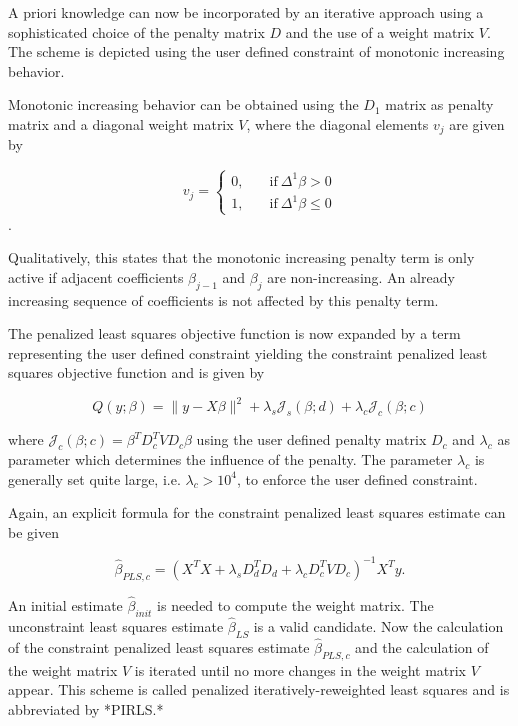\documentclass[10pt,a4paper]{article}
\begin{document}
	A priori knowledge can now be incorporated by an iterative approach using a sophisticated choice of the penalty matrix $D$ and the use of a weight matrix $V$. The scheme is depicted using the user defined constraint of monotonic increasing behavior.  
	
	Monotonic increasing behavior can be obtained using the $D_1$ matrix as penalty matrix and a diagonal weight matrix $V$, where the diagonal elements $v_j$ are given by
	
	$$v_j = \begin{cases} 0, & \quad \text{if} \ \Delta^1 \beta > 0 \\ 
						  1, & \quad \text{if} \ \Delta^1 \beta \le 0 
		 	\end{cases}$$.
	
	Qualitatively, this states that the monotonic increasing penalty term is only active if adjacent coefficients $\beta_{j-1}$ and $\beta_j$ are non-increasing. An already increasing sequence of coefficients is not affected by this penalty term. 
	
	The penalized least squares objective function is now expanded by a term representing the user defined constraint yielding the constraint penalized least squares objective function and is given by
	
	$$Q(y; \beta) = \lVert y - X\beta \rVert^2 + \lambda_s \mathcal J_s(\beta; d) + \lambda_c \mathcal J_c(\beta; c) $$
	
	where $\mathcal J_c(\beta; c) = \beta^T D_c^T V D_c \beta$ using the user defined penalty matrix $D_c$ and $\lambda_c$ as parameter which determines the influence of the penalty. The parameter $\lambda_c$ is generally set quite large, i.e. $\lambda_c > 10^4$, to enforce the user defined constraint. 
	
	Again, an explicit formula for the constraint penalized least squares estimate can be given
	
	$$\hat \beta_{PLS,c} = (X^TX + \lambda_s D_d^T D_d  + \lambda_c D_c^T V D_c)^{-1} X^T y.$$
	
	An initial estimate $\hat \beta_{init}$ is needed to compute the weight matrix. The unconstraint least squares estimate $\hat \beta_{LS}$ is a valid candidate. Now the calculation of the constraint penalized least squares estimate $\hat \beta_{PLS, c}$ and the calculation of the weight matrix $V$ is iterated until no more changes in the weight matrix $V$ appear. This scheme is called penalized iteratively-reweighted least squares and is abbreviated by *PIRLS.* 
	
\end{document}
